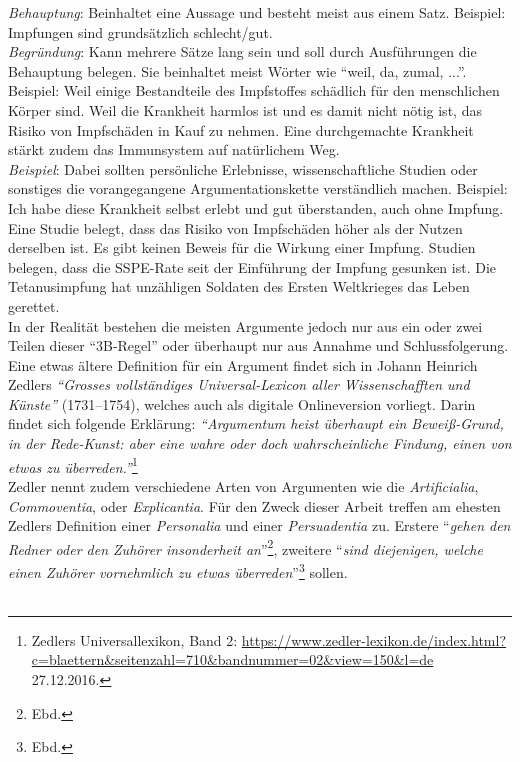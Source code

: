 \documentclass[
    a4paper,
    12pt,
    hyphens,
    chapterprefix=true,
    headheight=33pt,
    footheight=29pt,
    headings=optiontohead,
]{scrartcl}
\begin{document}
\textit{Behauptung}: Beinhaltet eine Aussage und besteht meist aus einem Satz. Beispiel: Impfungen sind grundsätzlich schlecht/gut.
\\
\textit{Begründung}: Kann mehrere Sätze lang sein und soll durch Ausführungen die Behauptung belegen. Sie beinhaltet meist Wörter wie "`weil, da, zumal, ..."'. Beispiel: Weil einige Bestandteile des Impfstoffes schädlich für den menschlichen Körper sind. Weil die Krankheit harmlos ist und es damit nicht nötig ist, das Risiko von Impfschäden in Kauf zu nehmen. Eine durchgemachte Krankheit stärkt zudem das Immunsystem auf natürlichem Weg.
\\
\textit{Beispiel}: Dabei sollten persönliche Erlebnisse, wissenschaftliche Studien oder sonstiges die vorangegangene Argumentationskette verständlich machen. Beispiel: Ich habe diese Krankheit selbst erlebt und gut überstanden, auch ohne Impfung. Eine Studie belegt, dass das Risiko von Impfschäden höher als der Nutzen derselben ist. Es gibt keinen Beweis für die Wirkung einer Impfung. Studien belegen, dass die SSPE-Rate seit der Einführung der Impfung gesunken ist. Die Tetanusimpfung hat unzähligen Soldaten des Ersten Weltkrieges das Leben gerettet.
\\
In der Realität bestehen die meisten Argumente jedoch nur aus ein oder zwei Teilen dieser "`3B-Regel"' oder überhaupt nur aus Annahme und Schlussfolgerung.\\
Eine etwas ältere Definition für ein Argument findet sich in Johann Heinrich Zedlers \textit{"`Grosses vollständiges Universal-Lexicon aller Wissenschafften und Künste"'}  (1731--1754), welches auch als digitale Onlineversion vorliegt. Darin findet sich folgende Erklärung: \textit{"`Argumentum heist überhaupt ein Beweiß-Grund, in der Rede-Kunst: aber eine wahre oder doch wahrscheinliche Findung, einen von etwas zu überreden."'}\footnote{Zedlers Universallexikon, Band 2: \url{https://www.zedler-lexikon.de/index.html?c=blaettern&seitenzahl=710&bandnummer=02&view=150&l=de} 27.12.2016.}\\
Zedler nennt zudem verschiedene Arten von Argumenten wie die \textit{Artificialia}, \textit{Commoventia}, oder \textit{Explicantia}. Für den Zweck dieser Arbeit treffen am ehesten Zedlers Definition einer \textit{Personalia} und einer \textit{Persuadentia} zu. Erstere "`\textit{gehen den Redner oder den Zuhörer insonderheit an}"'\footnote{Ebd.}, zweitere "`\textit{sind diejenigen, welche einen Zuhörer vornehmlich zu etwas überreden}"'\footnote{Ebd.} sollen.\\
\\
\end{document}
